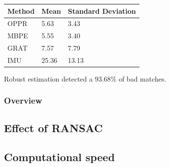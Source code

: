 \begin{table}
	\centering
	\begin{tabular}{| l | l | l |}
		\hline
		Method & Mean & Standard Deviation \\
		\hline
		OPPR &  5.63 \degree & 3.43 \degree \\
		\hline
		MBPE &  5.55 \degree & 3.40 \degree \\
		\hline
		GRAT &  7.57 \degree & 7.79 \degree \\ 
		\hline
		IMU &  25.36 \degree & 13.13 \degree \\ 
		\hline
	\end{tabular}
	\label{cha5:sec1:r2anglet}
\end{table}

Robust estimation detected a $ 93.68 \%$ of bad matches.


\subsubsection{Overview}



\subsection{Effect of RANSAC}


\subsection{Computational speed}